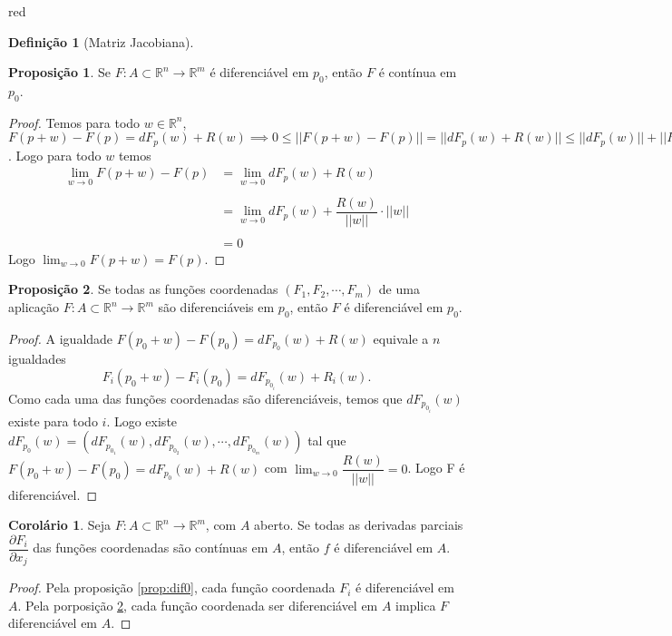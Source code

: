 \documentclass[12pt,leqno,twoside]{amsart}
\theoremstyle{definition}
\newtheorem{proposicao}{Proposição}[section]
\newtheorem{corolario}{Corolário}[section]
\newtheorem{definicao}{Definição}[section]
\begin{document}
\begin{color}{red}
\begin{definicao}[Matriz Jacobiana]
\end{definicao}

\vspace{0.3cm}

\begin{proposicao}

	Se $F:A\subset \mathbb{R}^n \to \mathbb{R}^m$ é diferenciável em $p_0$, então $F$ é contínua em $p_0$.
\end{proposicao}

\begin{proof}
	Temos para todo $w\in \mathbb{R}^n$, $F(p+w) - F(p) = dF_p(w) + R(w) \implies 0 \leq || F(p+w) - F(p) || = || dF_p(w) + R(w) || \leq || dF_p(w) || + \left|\left| R(w) \right|\right| $. Logo para todo $w$  temos
	\begin{align*}
		\lim_{w\to 0}  F(p+w) - F(p) & = \lim_{w\to 0} dF_p(w) +R(w)  \\~\\
		&=   \lim_{w\to 0}  dF_p(w)  +\dfrac{ R(w) }{||w||} \cdot ||w|| \\~\\
		&= 0
	\end{align*}
	Logo $\lim_{w\to 0} F(p+w) = F(p)$.
\end{proof}

\vspace{0.3cm}

\begin{proposicao}
	\label{prop:difn}
	Se todas as funções coordenadas $\left(F_1,F_2,\cdots, F_m\right) $ de uma aplicação $F:A\subset \mathbb{R}^n \to \mathbb{R}^m$ são diferenciáveis em $p_0$, então $F$ é diferenciável em $p_0$.

\end{proposicao}
\begin{proof}
	A igualdade $F(p_0+w)-F(p_0) = dF_{p_0}(w)+R(w)$ equivale a $n$ igualdades $$F_i(p_0 +w) - F_i(p_0) = dF_{p_{0_i}}(w)+R_i(w).$$
	Como cada uma das funções coordenadas são diferenciáveis, temos que $dF_{p_{0_i}}(w)$ existe para todo $i$.
	Logo existe $dF_{p_0}(w) = \left(dF_{p_{0_1}}(w), dF_{p_{0_2}}(w), \cdots, dF_{p_{0_m}}(w)\right)$ tal que $F(p_0+w)-F(p_0) = dF_{p_0}(w)+R(w)$ com $\displaystyle\lim_{w\to 0} \dfrac{R(w)}{||w||} = 0$. Logo F é diferenciável.

\end{proof}

\vspace{0.3cm}

\begin{corolario}
	\label{cor:e1}
	Seja $F:A\subset \mathbb{R}^n\to \mathbb{R}^m$, com $A$ aberto. Se todas as derivadas parciais $\dfrac{\partial F_i}{\partial x_j}$ das funções coordenadas são contínuas em $A$, então $f$ é diferenciável em $A$.
\end{corolario}
\begin{proof}
	Pela proposição \ref{prop:dif0}, cada função coordenada $F_i$ é diferenciável em $A$. Pela porposição \ref{prop:difn}, cada função coordenada ser diferenciável em $A$ implica $F$ diferenciável em $A$.
\end{proof}


\end{color}
\end{document}
